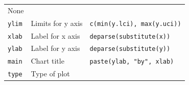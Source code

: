 \documentclass[12pt,]{book}
\theoremstyle{definition}
\theoremstyle{definition}
\theoremstyle{definition}
\theoremstyle{remark}
\begin{document}
\begin{longtable}[]{@{}lll@{}}
\begin{minipage}[t]{0.39\columnwidth}
None\strut
\end{minipage}\tabularnewline
\begin{minipage}[t]{0.15\columnwidth}\raggedright
\texttt{ylim}\strut
\end{minipage} & \begin{minipage}[t]{0.32\columnwidth}\raggedright
Limits for y axis\strut
\end{minipage} & \begin{minipage}[t]{0.39\columnwidth}\raggedright
\texttt{c(min(y.lci),\ max(y.uci))}\strut
\end{minipage}\tabularnewline
\begin{minipage}[t]{0.15\columnwidth}\raggedright
\texttt{xlab}\strut
\end{minipage} & \begin{minipage}[t]{0.32\columnwidth}\raggedright
Label for x axis\strut
\end{minipage} & \begin{minipage}[t]{0.39\columnwidth}\raggedright
\texttt{deparse(substitute(x))}\strut
\end{minipage}\tabularnewline
\begin{minipage}[t]{0.15\columnwidth}\raggedright
\texttt{ylab}\strut
\end{minipage} & \begin{minipage}[t]{0.32\columnwidth}\raggedright
Label for y axis\strut
\end{minipage} & \begin{minipage}[t]{0.39\columnwidth}\raggedright
\texttt{deparse(substitute(y))}\strut
\end{minipage}\tabularnewline
\begin{minipage}[t]{0.15\columnwidth}\raggedright
\texttt{main}\strut
\end{minipage} & \begin{minipage}[t]{0.32\columnwidth}\raggedright
Chart title\strut
\end{minipage} & \begin{minipage}[t]{0.39\columnwidth}\raggedright
\texttt{paste(ylab,\ "by",\ xlab)}\strut
\end{minipage}\tabularnewline
\begin{minipage}[t]{0.15\columnwidth}\raggedright
\texttt{type}\strut
\end{minipage} & \begin{minipage}[t]{0.32\columnwidth}\raggedright
Type of plot\strut
\end{minipage} & \begin{minipage}[t]{0.39\columnwidth}\raggedright

\end{minipage}
\end{longtable}
\end{document}

